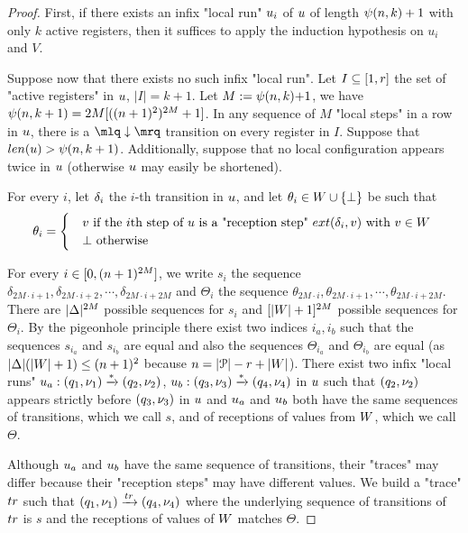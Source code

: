 \begin{proof}
	
	First, if there exists an infix "local run" $u_i$ of $u$ of length $\psi(n,k)+1$ with only $k$ active registers, then it suffices to apply the induction hypothesis on $u_i$ and $V$.
	
	Suppose now that there exists no such infix "local run".
	Let $I \subseteq [1,r]$ the set of "active registers" in $u$, $|I| = k+1$. Let $M:= \psi(n,k){+}1$, we have $\psi(n,k+1) = 2M [((n+1)^2)^{2M}+1]$. 
	In any sequence of $M$ "local steps" in a row in $u$, 
	there is a $\quotemarks{\enregact}$ transition on every register in $I$. Suppose that $\length{\localrun} > \towerfun(n,k+1)$. Additionally, suppose that  no local configuration appears twice in $u$ (otherwise $u$ may easily be shortened). 
	
	
	For every $i$, let $\delta_i$ the $i$-th transition in $u$, and let $\theta_i\in W \cup \{\bot\}$ be such that 
	\[
	\theta_i = 
	\begin{cases}
		& 	v \text{ if the $i$th step of $u$ is a "reception step" $\extlabel{\delta_i}{v}$ with $v \in \Vinit$ } \\ 
		& 	\bot \text{ otherwise}
	\end{cases}
	\]

	For every $i \in [0,(n+1)^{2M}]$, we write $s_i$ the sequence $\delta_{2  M \cdot i+1}, \delta_{2  M \cdot i+2}, \cdots, \delta_{2 M \cdot i+2M}$ and $\Theta_i$ the sequence $\theta_{2  M \cdot i}, \theta_{2 M \cdot i+1}, \cdots, \theta_{2 M \cdot i+2M}$.
	There are $|\Delta|^{2M}$ possible sequences for $s_i$ and $[|W| +1]^{2M}$ possible sequences for $\Theta_i$.
	By the pigeonhole principle there exist two indices $i_a, i_b$ such that the sequences $s_{i_a}$ and $s_{i_b}$ are equal and also the sequences $\Theta_{i_a}$ and $\Theta_{i_b}$ are equal (as $|\Delta| (|W|+1) \leq (n+1)^2$ because $n=|\mathcal{P}| -r + |W|$). 
	There exist two infix "local runs" $u_a: (q_1, \nu_1) \xrightarrow{*} (q_2, \nu_2)$, $u_b: (q_3, \nu_3) \xrightarrow{*} (q_4, \nu_4)$ in $u$ such that $(q_2,\nu_2)$ appears strictly before $(q_3,\nu_3)$ in $u$ and $u_a$ and $u_b$ both have the same sequences of transitions, which we call $s$, and of receptions of values from $W$, which we call $\Theta$.
	
	Although $u_a$ and $u_b$ have the same sequence of transitions, their "traces" may differ because their "reception steps" may have different values.
	We build a "trace" $\atrace$ such that $(q_1,\localdata_1) \step{\atrace} (q_4, \localdata_4)$ where the underlying sequence of transitions of $\atrace$ is $s$ and the receptions of values of $W$ matches $\Theta$.
	

\end{proof}
